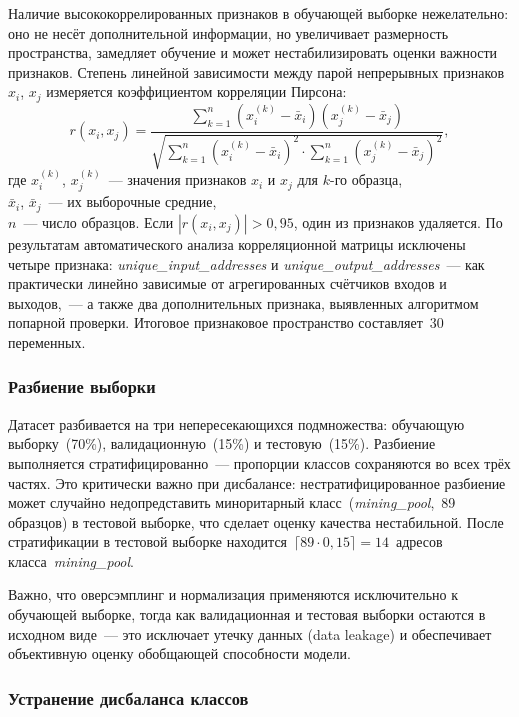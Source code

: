 Наличие высококоррелированных признаков в обучающей выборке нежелательно: оно не несёт дополнительной информации, но увеличивает размерность пространства, замедляет обучение и может нестабилизировать оценки важности признаков. Степень линейной зависимости между парой непрерывных признаков $x_i$, $x_j$ измеряется коэффициентом корреляции Пирсона:
\begin{equation}\label{eq:pearson}
    r(x_i, x_j) = \frac{\sum_{k=1}^{n}(x_i^{(k)} - \bar{x}_i)(x_j^{(k)} - \bar{x}_j)}
    {\sqrt{\sum_{k=1}^{n}(x_i^{(k)} - \bar{x}_i)^2 \cdot \sum_{k=1}^{n}(x_j^{(k)} - \bar{x}_j)^2}},
\end{equation}
где $x_i^{(k)}$, $x_j^{(k)}$~--- значения признаков $x_i$ и $x_j$ для $k$-го образца, \\ $\bar{x}_i$, $\bar{x}_j$~--- их выборочные средние, \\ $n$~--- число образцов. Если $|r(x_i, x_j)| > 0{,}95$, один из признаков удаляется. По результатам автоматического анализа корреляционной матрицы исключены четыре признака: \textit{unique\_input\_addresses} и \textit{unique\_output\_addresses}~--- как практически линейно зависимые от агрегированных счётчиков входов и выходов,~--- а также два дополнительных признака, выявленных алгоритмом попарной проверки. Итоговое признаковое пространство составляет~30 переменных.

\subsubsection{Разбиение выборки}

Датасет разбивается на три непересекающихся подмножества: обучающую выборку~(70\%), валидационную~(15\%) и тестовую~(15\%). Разбиение выполняется стратифицированно~--- пропорции классов сохраняются во всех трёх частях. Это критически важно при дисбалансе: нестратифицированное разбиение может случайно недопредставить миноритарный класс~(\textit{mining\_pool},~89 образцов) в тестовой выборке, что сделает оценку качества нестабильной. После стратификации в тестовой выборке находится~$\lceil 89 \cdot 0{,}15 \rceil = 14$~адресов класса~\textit{mining\_pool}.

Важно, что оверсэмплинг и нормализация применяются исключительно к обучающей выборке, тогда как валидационная и тестовая выборки остаются в исходном виде~--- это исключает утечку данных (data leakage) и обеспечивает объективную оценку обобщающей способности модели.

\subsubsection{Устранение дисбаланса классов}

